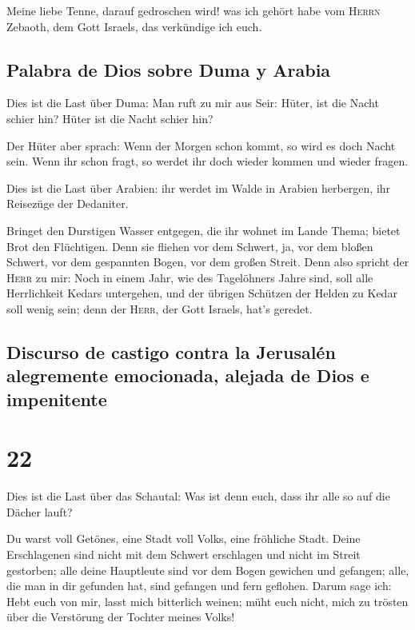  Meine liebe Tenne, darauf gedroschen wird! was ich
gehört habe vom \textsc{Herrn} Zebaoth, dem Gott Israels, das verkündige
ich euch.

\hypertarget{palabra-de-dios-sobre-duma-y-arabia}{%
\subsection{Palabra de Dios sobre Duma y
Arabia}\label{palabra-de-dios-sobre-duma-y-arabia}}

 Dies ist die Last über Duma: Man ruft zu mir aus Seir:
Hüter, ist die Nacht schier hin? Hüter ist die Nacht schier hin?

 Der Hüter aber sprach: Wenn der Morgen schon kommt, so
wird es doch Nacht sein. Wenn ihr schon fragt, so werdet ihr doch wieder
kommen und wieder fragen.

 Dies ist die Last über Arabien: ihr werdet im Walde in
Arabien herbergen, ihr Reisezüge der Dedaniter.

 Bringet den Durstigen Wasser entgegen, die ihr wohnet im
Lande Thema; bietet Brot den Flüchtigen.  Denn sie
fliehen vor dem Schwert, ja, vor dem bloßen Schwert, vor dem gespannten
Bogen, vor dem großen Streit.  Denn also spricht der
\textsc{Herr} zu mir: Noch in einem Jahr, wie des Tagelöhners Jahre
sind, soll alle Herrlichkeit Kedars untergehen,  und der
übrigen Schützen der Helden zu Kedar soll wenig sein; denn der
\textsc{Herr}, der Gott Israels, hat's geredet.

\hypertarget{discurso-de-castigo-contra-la-jerusaluxe9n-alegremente-emocionada-alejada-de-dios-e-impenitente}{%
\subsection{Discurso de castigo contra la Jerusalén alegremente
emocionada, alejada de Dios e
impenitente}\label{discurso-de-castigo-contra-la-jerusaluxe9n-alegremente-emocionada-alejada-de-dios-e-impenitente}}

\hypertarget{section-21}{%
\section{22}\label{section-21}}

 Dies ist die Last über das Schautal: Was ist denn euch,
dass ihr alle so auf die Dächer lauft?

 Du warst voll Getönes, eine Stadt voll Volks, eine
fröhliche Stadt. Deine Erschlagenen sind nicht mit dem Schwert
erschlagen und nicht im Streit gestorben;  alle deine
Hauptleute sind vor dem Bogen gewichen und gefangen; alle, die man in
dir gefunden hat, sind gefangen und fern geflohen.  Darum
sage ich: Hebt euch von mir, lasst mich bitterlich weinen; müht euch
nicht, mich zu trösten über die Verstörung der Tochter meines Volks!

